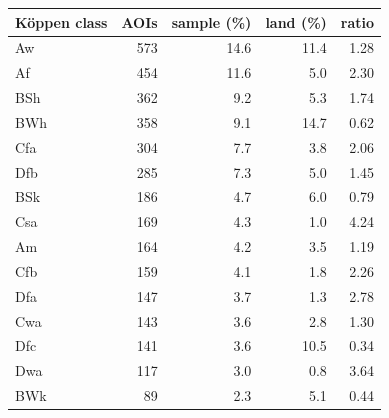 \begin{tabular}{lrrrr}
\toprule
K\"oppen class & AOIs & sample (\%) & land (\%) & ratio \\
\midrule
Aw & 573 & 14.6 & 11.4 & 1.28 \\
Af & 454 & 11.6 & 5.0 & 2.30 \\
BSh & 362 & 9.2 & 5.3 & 1.74 \\
BWh & 358 & 9.1 & 14.7 & 0.62 \\
Cfa & 304 & 7.7 & 3.8 & 2.06 \\
Dfb & 285 & 7.3 & 5.0 & 1.45 \\
BSk & 186 & 4.7 & 6.0 & 0.79 \\
Csa & 169 & 4.3 & 1.0 & 4.24 \\
Am & 164 & 4.2 & 3.5 & 1.19 \\
Cfb & 159 & 4.1 & 1.8 & 2.26 \\
Dfa & 147 & 3.7 & 1.3 & 2.78 \\
Cwa & 143 & 3.6 & 2.8 & 1.30 \\
Dfc & 141 & 3.6 & 10.5 & 0.34 \\
Dwa & 117 & 3.0 & 0.8 & 3.64 \\
BWk & 89 & 2.3 & 5.1 & 0.44 \\
\bottomrule
\end{tabular}
